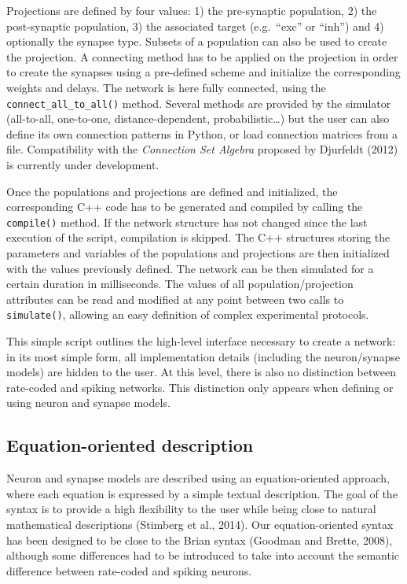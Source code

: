 \documentclass[
  11pt,
  a4paper,
]{scrbook}
\begin{document}
Projections are defined by four values: 1) the pre-synaptic population,
2) the post-synaptic population, 3) the associated target (e.g.~``exc''
or ``inh'') and 4) optionally the synapse type. Subsets of a population
can also be used to create the projection. A connecting method has to be
applied on the projection in order to create the synapses using a
pre-defined scheme and initialize the corresponding weights and delays.
The network is here fully connected, using the
\texttt{connect\_all\_to\_all()} method. Several methods are provided by
the simulator (all-to-all, one-to-one, distance-dependent,
probabilistic\ldots) but the user can also define its own connection
patterns in Python, or load connection matrices from a file.
Compatibility with the \emph{Connection Set Algebra} proposed by
Djurfeldt (2012) is currently under development.

Once the populations and projections are defined and initialized, the
corresponding C++ code has to be generated and compiled by calling the
\texttt{compile()} method. If the network structure has not changed
since the last execution of the script, compilation is skipped. The C++
structures storing the parameters and variables of the populations and
projections are then initialized with the values previously defined. The
network can be then simulated for a certain duration in milliseconds.
The values of all population/projection attributes can be read and
modified at any point between two calls to \texttt{simulate()}, allowing
an easy definition of complex experimental protocols.

This simple script outlines the high-level interface necessary to create
a network: in its most simple form, all implementation details
(including the neuron/synapse models) are hidden to the user. At this
level, there is also no distinction between rate-coded and spiking
networks. This distinction only appears when defining or using neuron
and synapse models.

\subsection{Equation-oriented
description}\label{equation-oriented-description}

Neuron and synapse models are described using an equation-oriented
approach, where each equation is expressed by a simple textual
description. The goal of the syntax is to provide a high flexibility to
the user while being close to natural mathematical descriptions
(Stimberg et al., 2014). Our equation-oriented syntax has been designed
to be close to the Brian syntax (Goodman and Brette, 2008), although
some differences had to be introduced to take into account the semantic
difference between rate-coded and spiking neurons.
\end{document}
